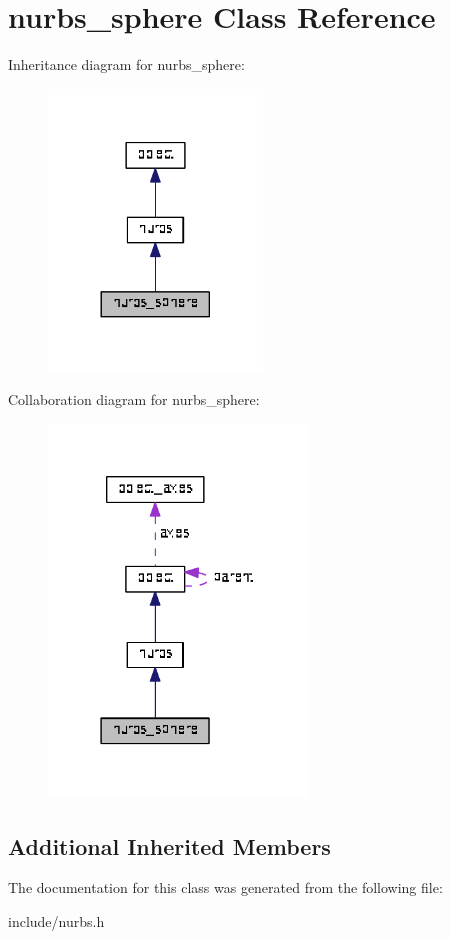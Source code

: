 \hypertarget{classnurbs__sphere}{}\section{nurbs\+\_\+sphere Class Reference}
\label{classnurbs__sphere}


Inheritance diagram for nurbs\+\_\+sphere\+:\nopagebreak
\begin{figure}[H]
\begin{center}
\leavevmode
\includegraphics[width=161pt]{classnurbs__sphere__inherit__graph}
\end{center}
\end{figure}


Collaboration diagram for nurbs\+\_\+sphere\+:\nopagebreak
\begin{figure}[H]
\begin{center}
\leavevmode
\includegraphics[width=195pt]{classnurbs__sphere__coll__graph}
\end{center}
\end{figure}
\subsection*{Additional Inherited Members}


The documentation for this class was generated from the following file\+:\begin{DoxyCompactItemize}
\item 
include/nurbs.\+h\end{DoxyCompactItemize}
